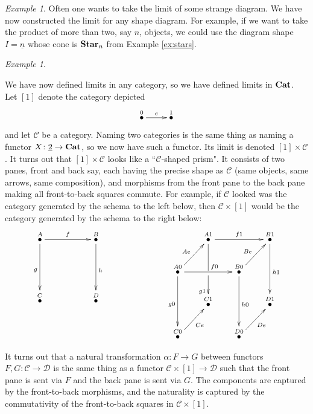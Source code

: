 \documentclass{book}
\def\mc{\mathcal}
\def\to{\rightarrow}
\def\taking{\colon}
\def\ul{\underline}
\newcommand{\LMO}[1]{\stackrel{#1}{\bullet}}
\def\Cat{{\bf Cat}}
\def\Star{{\bf Star}}
\def\mcC{\mc{C}}
\def\mcD{\mc{D}}
\theoremstyle{remark}
\newtheorem{example}[subsubsection]{Example}
\theoremstyle{definition}
\begin{document}
\begin{example}

Often one wants to take the limit of some strange diagram. We have now constructed the limit for any shape diagram. For example, if we want to take the product of more than two, say $n$, objects, we could use the diagram shape $I=\ul{n}$ whose cone is $\Star_n$ from Example \ref{ex:stars}.

\end{example}

\begin{example}\label{ex:product version of nat trans}

We have now defined limits in any category, so we have defined limits in $\Cat$. Let $[1]$ denote the category depicted 
$$\xymatrix{\LMO{0}\ar[r]^e&\LMO{1}}$$
and let $\mcC$ be a category. Naming two categories is the same thing as naming a functor $X\taking\ul{2}\to\Cat$, so we now have such a functor. Its limit is denoted $[1]\times\mcC$. It turns out that $[1]\times\mcC$ looks like a ``$\mcC$-shaped prism". It consists of two panes, front and back say, each having the precise shape as $\mcC$ (same objects, same arrows, same composition), and morphisms from the front pane to the back pane making all front-to-back squares commute. For example, if $\mcC$ looked was the category generated by the schema to the left below, then $\mcC\times[1]$ would be the category generated by the schema to the right below:
$$
\xymatrix{
\LMO{A}\ar[rr]^f\ar[dd]_g&&\LMO{B}\ar[dd]^h\\\\\LMO{C}&&\LMO{D}
}
\hspace{1in}
\xymatrix@=20pt{
&\LMO{A1}\ar[rr]^{f1}\ar'[d][dd]_(.6){g1}&&\LMO{B1}\ar[dd]^{h1}\\
\LMO{A0}\ar[ur]^{Ae}\ar[rr]^(.6){f0}\ar[dd]_{g0}&&\LMO{B0}\ar[ur]^{Be}\ar[dd]^{h0}\\
&\LMO{C1}&&\LMO{D1}\\
\LMO{C0}\ar[ur]_{Ce}&&\LMO{D0}\ar[ur]_{De}&
}
$$

It turns out that a natural transformation $\alpha\taking F\to G$ between functors $F,G\taking\mcC\to\mcD$ is the same thing as a functor $\mcC\times[1]\to\mcD$ such that the front pane is sent via $F$ and the back pane is sent via $G$. The components are captured by the front-to-back morphisms, and the naturality is captured by the commutativity of the front-to-back squares in $\mcC\times[1]$.

\end{example}
\end{document}
